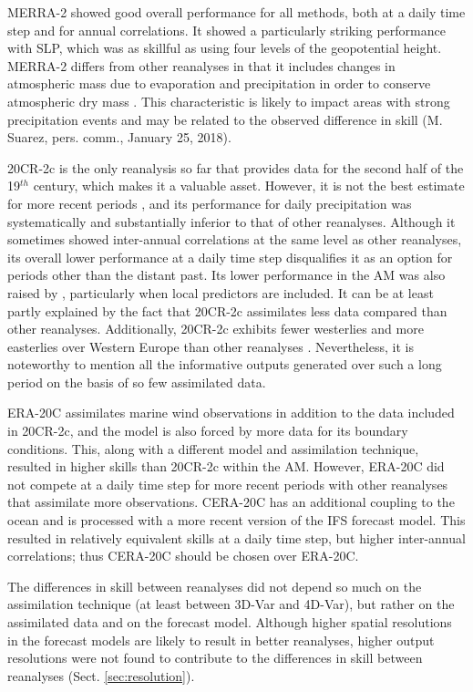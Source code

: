\documentclass[smallextended]{svjour3}       %
\begin{document}
	MERRA-2 showed good overall performance for all methods, both at a daily time step and for annual correlations. It showed a particularly striking performance with SLP, which was as skillful as using four levels of the geopotential height. MERRA-2 differs from other reanalyses in that it includes changes in atmospheric mass due to evaporation and precipitation in order to conserve atmospheric dry mass \cite{Gelaro2017}. This characteristic is likely to impact areas with strong precipitation events and may be related to the observed difference in skill (M. Suarez, pers. comm., January 25, 2018). 
	
	20CR-2c is the only reanalysis so far that provides data for the second half of the 19$^{th}$ century, which makes it a valuable asset. However, it is not the best estimate for more recent periods \citep{Poli2017}, and its performance for daily precipitation was systematically and substantially inferior to that of other reanalyses. Although it sometimes showed inter-annual correlations at the same level as other reanalyses, its overall lower performance at a daily time step disqualifies it as an option for periods other than the distant past. Its lower performance in the AM was also raised by \citet[][]{Dayon2015}, particularly when local predictors are included. It can be at least partly explained by the fact that 20CR-2c assimilates less data compared than other reanalyses. Additionally, 20CR-2c exhibits fewer westerlies and more easterlies over Western Europe than other reanalyses \citep{Rohrer2018}. Nevertheless, it is noteworthy to mention all the informative outputs generated over such a long period on the basis of so few assimilated data.
	
	ERA-20C assimilates marine wind observations in addition to the data included in 20CR-2c, and the model is also forced by more data for its boundary conditions. This, along with a different model and assimilation technique, resulted in higher skills than 20CR-2c within the AM. However, ERA-20C did not compete at a daily time step for more recent periods with other reanalyses that assimilate more observations. CERA-20C has an additional coupling to the ocean and is processed with a more recent version of the IFS forecast model. This resulted in relatively equivalent skills at a daily time step, but higher inter-annual correlations; thus CERA-20C should be chosen over ERA-20C.
	
	The differences in skill between reanalyses did not depend so much on the assimilation technique (at least between 3D-Var and 4D-Var), but rather on the assimilated data and on the forecast model. Although higher spatial resolutions in the forecast models are likely to result in better reanalyses, higher output resolutions were not found to contribute to the differences in skill between reanalyses (Sect. \ref{sec:resolution}). 
	
\end{document}
